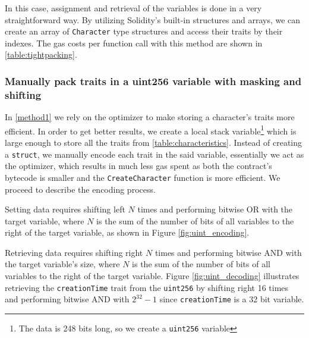 

In this case, assignment and retrieval of the variables is done in a very straightforward way. By utilizing Solidity's built-in structures and arrays, we can create an array of \texttt{Character} type structures and access their traits by their indexes. The gas costs per function call with this method are shown in \ref{table:tightpacking}.



\subsubsection{Manually pack traits in a uint256 variable with masking and shifting} \label{method2}
    
In \ref{method1} we rely on the optimizer to make storing a character's traits more efficient. In order to get better results, we create a local stack variable\footnote{The data is 248 bits long, so we create a \texttt{uint256} variable} which is large enough to store all the traits from \ref{table:characteristics}. Instead of creating a \texttt{struct}, we manually encode each trait in the said variable, essentially we act as the optimizer, which results in much less gas spent as both the contract's bytecode is smaller and the \texttt{CreateCharacter} function is more efficient. We proceed to describe the encoding process.




Setting data requires shifting left $N$ times and performing bitwise OR with the target variable, where $N$ is the sum of the number of bits of all variables to the right of the target variable, as shown in Figure \ref{fig:uint_encoding}. 




Retrieving data requires shifting right $N$ times and performing bitwise AND with the target variable's size, where $N$ is the sum of the number of bits of all variables to the right of the target variable. Figure \ref{fig:uint_decoding} illustrates retrieving the \texttt{creationTime} trait from the \texttt{uint256} by shifting right 16 times and performing bitwise AND with $2^{32}-1$ since \texttt{creationTime} is a 32 bit variable. 

